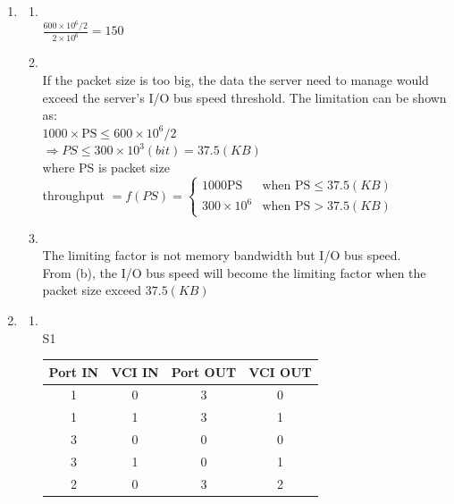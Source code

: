 \documentclass[10pt, a4paper]{article}
\begin{document}
\begin{enumerate}
\item\mbox{}
    \begin{enumerate}
    \item\mbox{}\\
        $\frac{600 \times 10^6 / 2}{2 \times 10^6} = 150$
    \item\mbox{}\\
        If the packet size is too big, the data the server need to manage would exceed the server's I/O bus speed threshold. The limitation can be shown as:\\
        $1000 \times \mbox{PS} \leq 600 \times 10^6 / 2$\\
        $\Rightarrow PS \leq 300 \times 10^3 (bit) = 37.5 (KB)$\\
        where PS is packet size\\
        throughput $ = f(PS) = \left\{
            \begin{array}{ll}
                1000 \mbox{PS} & \mbox{when PS} \leq 37.5 (KB)\\
                300 \times 10^6 & \mbox{when PS} > 37.5 (KB)
            \end{array}
        \right.$
    \item\mbox{}\\
        The limiting factor is not memory bandwidth but I/O bus speed.\\
        From (b), the I/O bus speed will become the limiting factor when the packet size exceed $37.5 (KB)$
    \end{enumerate}

\item\mbox{}
    \begin{enumerate}
    \item\mbox{}\\
        S1\\
        \begin{tabular}{cccc}
            \toprule
            Port IN & VCI IN & Port OUT & VCI OUT\\
            \hline
            1 & 0 & 3 & 0\\
            1 & 1 & 3 & 1\\
            3 & 0 & 0 & 0\\
            3 & 1 & 0 & 1\\
            2 & 0 & 3 & 2\\
            \bottomrule
        \end{tabular}\\


\end{enumerate}
\end{enumerate}
\end{document}
